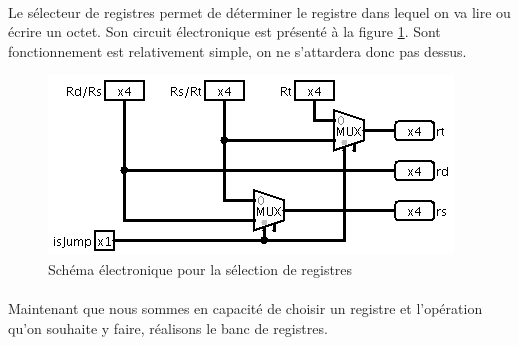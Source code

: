 \paragraph{}{
	Le sélecteur de registres permet de déterminer le registre
	dans lequel on va lire ou écrire un octet. Son circuit électronique
	est présenté à la figure \ref{selec_reg_circ}.
	Sont fonctionnement est relativement simple, on ne s’attardera donc
	pas dessus.
}

\begin{figure}
	\centering
	\includegraphics[scale=0.8,origin=c]{circuits/selec_reg.png}
	\caption{
		\label{selec_reg_circ}
		Sch\'{e}ma \'{e}lectronique pour la s\'{e}lection de registres
	}
\end{figure}

\paragraph{}{
	Maintenant que nous sommes en capacité de choisir un registre
	et l'opération qu'on souhaite y faire, réalisons le banc de
	registres.
}